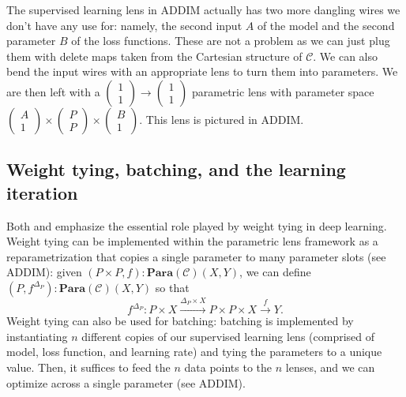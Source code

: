 \documentclass[11pt,a4paper,openright,twoside]{report}
\theoremstyle{plain}
\theoremstyle{definition}
\begin{document}
The supervised learning lens in ADDIM actually has two more dangling wires we don't have any use for: namely, the second input $A$ of the model and the second parameter $B$ of the loss functions. These are not a problem as we can just plug them with delete maps taken from the Cartesian structure of $\mathcal{C}$. We can also bend the input wires with an appropriate lens to turn them into parameters. We are then left with a $\left(\begin{smallmatrix} 1 \\ 1 \end{smallmatrix}\right) \to \left(\begin{smallmatrix} 1 \\ 1 \end{smallmatrix}\right)$ parametric lens with parameter space $\left(\begin{smallmatrix} A \\ 1 \end{smallmatrix}\right) \times \left(\begin{smallmatrix} P \\ P \end{smallmatrix}\right) \times \left(\begin{smallmatrix} B \\ 1 \end{smallmatrix}\right)$. This lens is pictured in ADDIM.




\subsection{Weight tying, batching, and the learning iteration}

Both \cite{cruttwell2022categorical} and \cite{gavranovic2024fundamental} emphasize the essential role played by weight tying in deep learning. Weight tying can be implemented within the parametric lens framework as a reparametrization that copies a single parameter to many parameter slots (see ADDIM): given $(P \times P, f): \mathbf{Para}(\mathcal{C})(X,Y)$, we can define $(P, f^{\Delta_P}): \mathbf{Para}(\mathcal{C})(X,Y)$ so that
\[f^{\Delta_P}: P \times X \stackrel{\Delta_P \times X}{\longrightarrow} P \times P \times X \stackrel{f}{\longrightarrow} Y.\]
Weight tying can also be used for batching: batching is implemented by instantiating $n$ different copies of our supervised learning lens (comprised of model, loss function, and learning rate) and tying the parameters to a unique value. Then, it suffices to feed the $n$ data points to the $n$ lenses, and we can optimize across a single parameter (see ADDIM).
\end{document}
